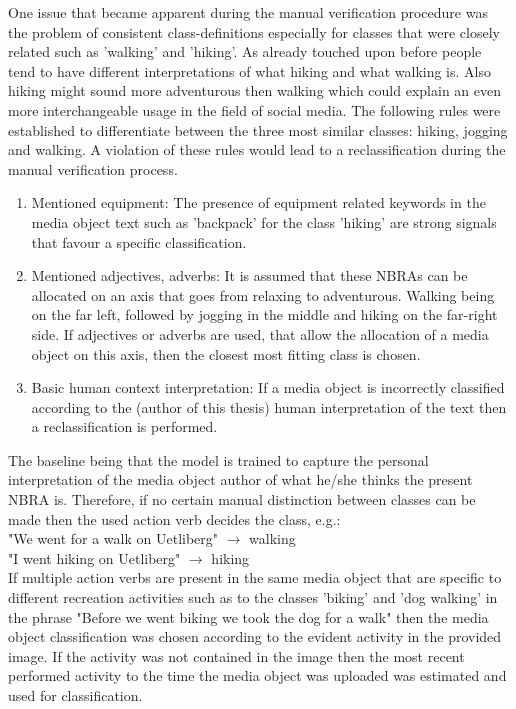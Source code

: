 \newline
One issue that became apparent during the manual verification procedure was the problem of consistent class-definitions especially for classes that were closely related such as 'walking' and 'hiking'. As already touched upon before people tend to have different interpretations of what hiking and what walking is. Also hiking might sound more adventurous then walking which could explain an even more interchangeable usage in the field of social media. The following rules were established to differentiate between the three most similar classes: hiking, jogging and walking. A violation of these rules would lead to a reclassification during the manual verification process.

\begin{enumerate}
    \item Mentioned equipment: The presence of equipment related keywords in the media object text such as 'backpack' for the class 'hiking' are strong signals that favour a specific classification.
    \item Mentioned adjectives, adverbs: It is assumed that these NBRAs can be allocated on an axis that goes from relaxing to adventurous. Walking being on the far left, followed by jogging in the middle and hiking on the far-right side. If adjectives or adverbs are used, that allow the allocation of a media object on this axis, then the closest most fitting class is chosen.
    \item Basic human context interpretation: If a media object is incorrectly classified according to the (author of this thesis) human interpretation of the text then a reclassification is performed.
\end{enumerate}

The baseline being that the model is trained to capture the personal interpretation of the media object author of what he/she thinks the present NBRA is. Therefore, if no certain manual distinction between classes can be made then the used action verb decides the class, e.g.:\\
"We went for a walk on Uetliberg" $\to$ walking \\
"I went hiking on Uetliberg" $\to$ hiking\\
If multiple action verbs are present in the same media object that are specific to different recreation activities such as to the classes 'biking' and 'dog walking' in the phrase "Before we went biking we took the dog for a walk" then the media object classification was chosen according to the evident activity in the provided image. If the activity was not contained in the image then the most recent performed activity to the time the media object was uploaded was estimated and used for classification.

